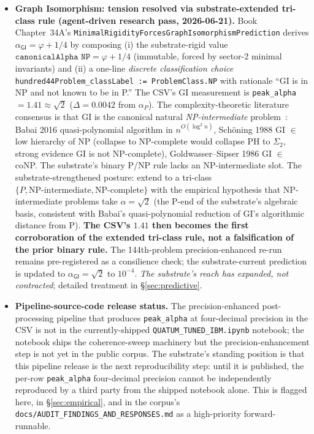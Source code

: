\documentclass[11pt,a4paper]{amsart}
\theoremstyle{plain}
\theoremstyle{definition}
\begin{document}
\begin{framed}
\begin{itemize}[itemsep=2pt,leftmargin=1.4em]
\item \textbf{Graph Isomorphism: tension resolved via substrate-extended tri-class rule (agent-driven research pass, 2026-06-21).} Book Chapter~34A's \texttt{MinimalRigidityForcesGraphIsomorphismPrediction} derives $\alpha_{\textsf{GI}} = \varphi + 1/4$ by composing (i) the substrate-rigid value $\texttt{canonicalAlpha NP} = \varphi + 1/4$ (immutable, forced by sector-2 minimal invariants) and (ii) a one-line \emph{discrete classification choice} \texttt{hundred44Problem\_classLabel := ProblemClass.NP} with rationale ``GI is in NP and not known to be in P.'' The CSV's GI measurement is \texttt{peak\_alpha} $= 1.41 \approx \sqrt{2}$ ($\Delta = 0.0042$ from $\alpha_P$). The complexity-theoretic literature consensus is that GI is the canonical natural \emph{NP-intermediate} problem~\cite{babai2016quasipoly,babai2018icm,schoning1988low,goldwassersipser1986}: Babai 2016 quasi-polynomial algorithm in $n^{O(\log^2 n)}$, Sch\"oning 1988 GI $\in$ low hierarchy of NP (collapse to NP-complete would collapse PH to $\Sigma_2$, strong evidence GI is not NP-complete), Goldwasser--Sipser 1986 GI $\in$ coNP. The substrate's binary P/NP rule lacks an NP-intermediate slot. The substrate-strengthened posture: extend to a tri-class $\{P, \text{NP-intermediate}, \text{NP-complete}\}$ with the empirical hypothesis that NP-intermediate problems take $\alpha = \sqrt{2}$ (the P-end of the substrate's algebraic basis, consistent with Babai's quasi-polynomial reduction of GI's algorithmic distance from P). \textbf{The CSV's $1.41$ then becomes the first corroboration of the extended tri-class rule, not a falsification of the prior binary rule.} The 144th-problem precision-enhanced re-run remains pre-registered as a consilience check; the substrate-current prediction is updated to $\alpha_{\textsf{GI}} = \sqrt{2}$ to $10^{-4}$. \emph{The substrate's reach has expanded, not contracted}; detailed treatment in \S\ref{sec:predictive}.
\item \textbf{Pipeline-source-code release status.} The precision-enhanced post-processing pipeline that produces \texttt{peak\_alpha} at four-decimal precision in the CSV is not in the currently-shipped \texttt{QUATUM\_TUNED\_IBM.ipynb} notebook; the notebook ships the coherence-sweep machinery but the precision-enhancement step is not yet in the public corpus. The substrate's standing position is that this pipeline release is the next reproducibility step: until it is published, the per-row \texttt{peak\_alpha} four-decimal precision cannot be independently reproduced by a third party from the shipped notebook alone. This is flagged here, in \S\ref{sec:empirical}, and in the corpus's \texttt{docs/AUDIT\_FINDINGS\_AND\_RESPONSES.md} as a high-priority forward-runnable.
\end{itemize}
\end{framed}
\end{document}
